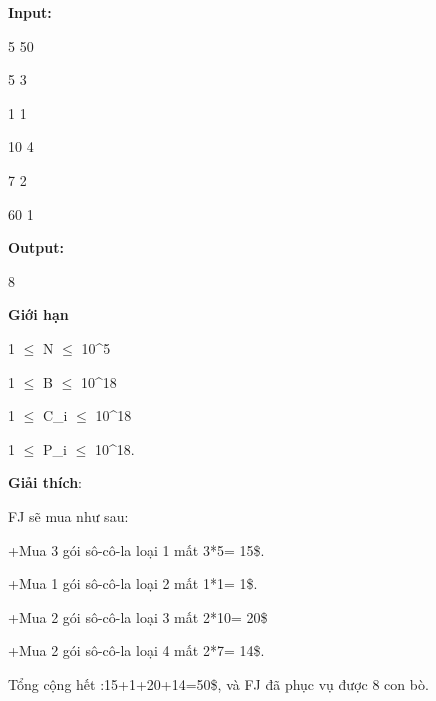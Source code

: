 \textbf{Input:}


5 50


5 3


1 1


10 4


7 2


60 1


\textbf{Output:}


8








\textbf{​Giới hạn}





1 $\le$ N $\le$ 10^5


1  $\le$  B  $\le$  10^18


1  $\le$  C\_i  $\le$  10^18


1  $\le$  P\_i  $\le$  10^18.





\textbf{Giải thích}:


FJ sẽ mua như sau:


+Mua 3 gói sô-cô-la loại 1 mất 3*5= 15\$.


+Mua 1 gói sô-cô-la loại 2 mất 1*1= 1\$.


+Mua 2 gói sô-cô-la loại 3 mất 2*10= 20\$


+Mua 2 gói sô-cô-la loại 4 mất 2*7= 14\$.


Tổng cộng hết :15+1+20+14=50\$, và FJ đã phục vụ được 8 con bò.